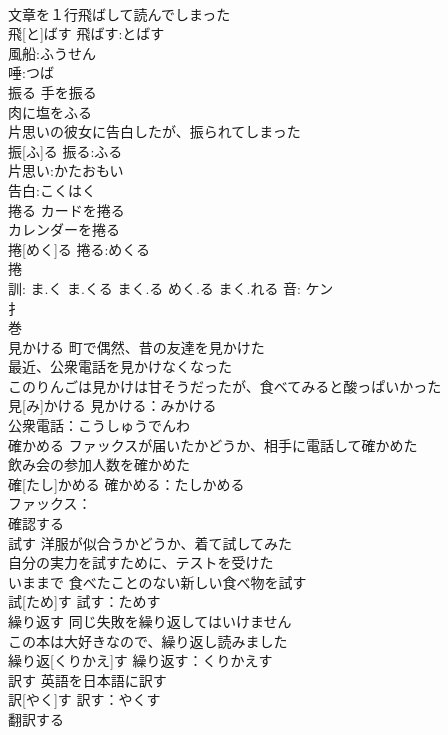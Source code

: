 \documentclass[8pt]{extreport}
\begin{document}
\begin{CJK}{UTF8}{min}
\\	文章を１行飛ばして読んでしまった 
\\	飛[と]ばす			飛ばす:とばす
\\	風船:ふうせん
\\	唾:つば
\\	振る	手を振る 
\\	肉に塩をふる 
\\	片思いの彼女に告白したが、振られてしまった 
\\	振[ふ]る			振る:ふる
\\	片思い:かたおもい
\\	告白:こくはく
\\	捲る	カードを捲る 
\\	カレンダーを捲る 
\\	捲[めく]る			捲る:めくる
\\	捲 
\\	訓: ま.く ま.くる まく.る めく.る まく.れる 音: ケン 
\\	扌 
\\	巻 
\\	見かける	町で偶然、昔の友達を見かけた 
\\	最近、公衆電話を見かけなくなった 
\\	このりんごは見かけは甘そうだったが、食べてみると酸っぱいかった 
\\	見[み]かける			見かける：みかける
\\	公衆電話：こうしゅうでんわ
\\	確かめる	ファックスが届いたかどうか、相手に電話して確かめた 
\\	飲み会の参加人数を確かめた 
\\	確[たし]かめる			確かめる：たしかめる
\\	ファックス：
\\	確認する 
\\	試す	洋服が似合うかどうか、着て試してみた 
\\	自分の実力を試すために、テストを受けた 
\\	いままで 食べたことのない新しい食べ物を試す 
\\	試[ため]す			試す：ためす
\\	繰り返す	同じ失敗を繰り返してはいけません 
\\	この本は大好きなので、繰り返し読みました 
\\	繰り返[くりかえ]す			繰り返す：くりかえす
\\	訳す	英語を日本語に訳す 
\\	訳[やく]す			訳す：やくす
\\	翻訳する 

\end{CJK}
\end{document}
